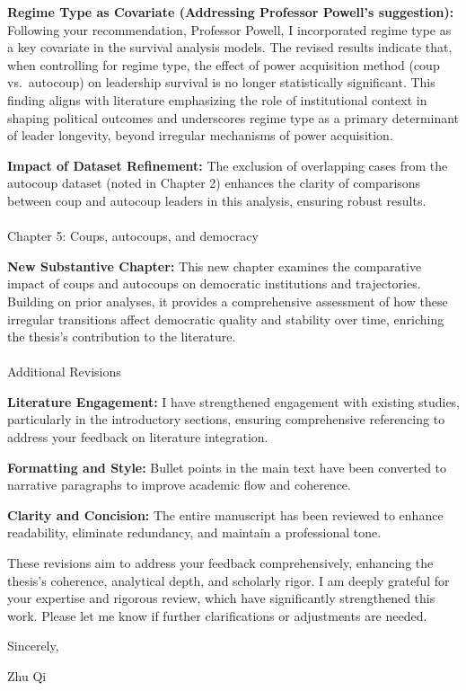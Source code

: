 \documentclass[
  12pt,
  letterpaper,
  DIV=11,
  numbers=noendperiod]{scrartcl}
\makeatletter
\let\oldparagraph\paragraph
\renewcommand{\paragraph}{
    \@ifstar
      \xxxParagraphStar
      \xxxParagraphNoStar
  }
\newcommand{\xxxParagraphStar}[1]{\oldparagraph*{#1}\mbox{}}
\newcommand{\xxxParagraphNoStar}[1]{\oldparagraph{#1}\mbox{}}
\makeatother
\begin{document}
\textbf{Regime Type as Covariate (Addressing Professor Powell's
suggestion):} Following your recommendation, Professor Powell, I
incorporated regime type as a key covariate in the survival analysis
models. The revised results indicate that, when controlling for regime
type, the effect of power acquisition method (coup vs.~autocoup) on
leadership survival is no longer statistically significant. This finding
aligns with literature emphasizing the role of institutional context in
shaping political outcomes and underscores regime type as a primary
determinant of leader longevity, beyond irregular mechanisms of power
acquisition.

\textbf{Impact of Dataset Refinement:} The exclusion of overlapping
cases from the autocoup dataset (noted in Chapter 2) enhances the
clarity of comparisons between coup and autocoup leaders in this
analysis, ensuring robust results.

\paragraph{Chapter 5: Coups, autocoups, and
democracy}\label{chapter-5-coups-autocoups-and-democracy}

\textbf{New Substantive Chapter:} This new chapter examines the
comparative impact of coups and autocoups on democratic institutions and
trajectories. Building on prior analyses, it provides a comprehensive
assessment of how these irregular transitions affect democratic quality
and stability over time, enriching the thesis's contribution to the
literature.

\paragraph{Additional Revisions}\label{additional-revisions}

\textbf{Literature Engagement:} I have strengthened engagement with
existing studies, particularly in the introductory sections, ensuring
comprehensive referencing to address your feedback on literature
integration.

\textbf{Formatting and Style:} Bullet points in the main text have been
converted to narrative paragraphs to improve academic flow and
coherence.

\textbf{Clarity and Concision:} The entire manuscript has been reviewed
to enhance readability, eliminate redundancy, and maintain a
professional tone.

These revisions aim to address your feedback comprehensively, enhancing
the thesis's coherence, analytical depth, and scholarly rigor. I am
deeply grateful for your expertise and rigorous review, which have
significantly strengthened this work. Please let me know if further
clarifications or adjustments are needed.

Sincerely,

Zhu Qi
\end{document}
